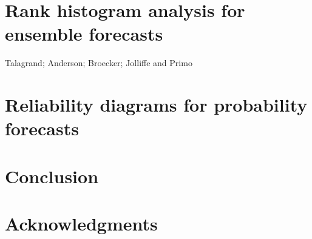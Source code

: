 \documentclass[article]{jss}
\begin{document}
\section{Rank histogram analysis for ensemble forecasts}

Talagrand; Anderson; Broecker; Jolliffe and Primo

\section{Reliability diagrams for probability forecasts}


\section{Conclusion}

\section*{Acknowledgments}



\end{document}
